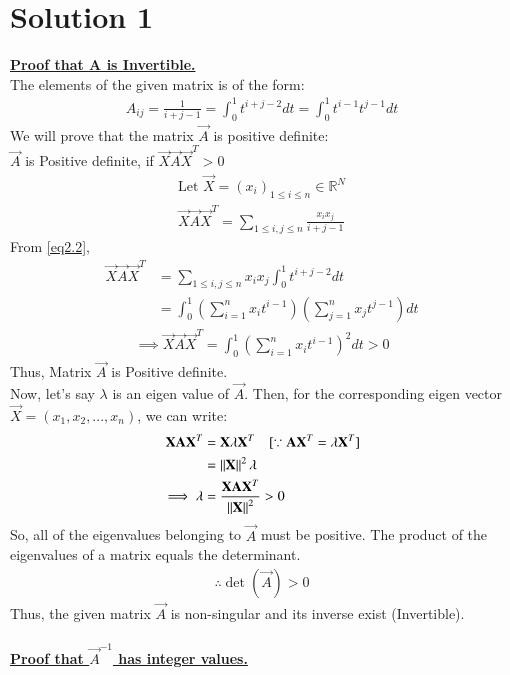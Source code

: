\documentclass[journal,12pt,twocolumn]{IEEEtran}
\begin{document}
\section{Solution 1}
\underline{\textbf{Proof that A is Invertible.}}\\
The elements of the given matrix is of the form:
\begin{align}
    A_{ij} = \frac{1}{i+j-1}= \int_{0}^{1}t^{i+j-2}dt= \int_{0}^{1}t^{i-1}t^{j-1}dt \label{eq2.2}
\end{align}
We will prove that the matrix $\vec{A}$ is positive definite:\\
$\vec{A}$ is Positive definite, if $\vec{X}\Vec{A}\vec{X}^T>0$
\begin{align}
   \text{Let } \vec{X}=(x_i)_{1\leq i\leq n} \in \mathbb{R}^N\\
   \vec{X}\Vec{A}\vec{X}^T=\sum_{1\leq i,j\leq n}\frac{x_ix_j}{i+j-1}
\end{align}
From \eqref{eq2.2},
\begin{align}
   \vec{X}\Vec{A}\vec{X}^T &=\sum_{1\leq i,j\leq n}x_ix_j\int_0^1t^{i+j-2}dt\\
   &=\int_0^1\left(\sum_{i=1}^nx_it^{i-1}\right)\left(\sum_{j=1}^nx_jt^{j-1}\right)dt
\end{align}
\begin{align}
       \implies \vec{X}\Vec{A}\vec{X}^T=\int_0^1\left(\sum_{i=1}^nx_it^{i-1}\right)^2dt>0
\end{align}
Thus, Matrix $\vec{A}$ is Positive definite. \\
Now, let's say $\lambda$ is an eigen value of $\vec{A}$. Then, for the corresponding eigen vector $\vec{X}=(x_1,x_2,...,x_n)$, we can write:
\begin{align}
       \vec{X}\Vec{A}\vec{X}^T&=\vec{X}\lambda\vec{X}^T \quad [\because  \Vec{A}\vec{X}^T=\lambda\vec{X}^T]\\
       &=\norm{\vec{X}}^2\lambda\\
       \implies \lambda&=\frac{\vec{X}\Vec{A}\vec{X}^T}{\norm{\vec{X}}^2}>0
\end{align}
So, all of the eigenvalues belonging to  $\vec{A}$ must be positive. The product of the eigenvalues of a matrix equals the determinant.
\begin{align}
    \boxed{\therefore \det({\vec{A}})>0}
\end{align}
Thus, the given matrix $\vec{A}$ is non-singular and its inverse exist (Invertible).\\ \\
\underline{\textbf{Proof that $\vec{A}^{-1}$ has integer values.}}\\
\end{document}
